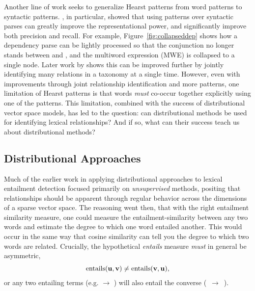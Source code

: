 Another line of work seeks to generalize Hearst patterns from word patterns
to syntactic patterns. , in particular, showed that
using patterns over syntactic parses can greatly improve the representational power,
and significantly improve both precision and recall. For example,
Figure~\ref{fig:collapseddep} shows how a dependency parse can be lightly
processed so that the conjunction  no longer stands between
 and , and the multiword expression (MWE) 
is collapsed to a single node. Later work by  shows
this can be improved further by jointly identifying many relations in a
taxonomy at a single time. However, even with improvements through joint
relationship identification and more patterns, one limitation of Hearst
patterns is that words {\em must} co-occur together explicitly using one of
the patterns. This limitation, combined with the success of distributional
vector space models, has led to the question: can distributional methods be
used for identifying lexical relationships? And if so, what can their
success teach us about distributional methods?

\subsection{Distributional Approaches}
\label{sec:dih}

Much of the earlier work in applying distributional approaches to lexical
entailment detection focused primarily on {\em unsupervised} methods, positing
that relationships should be apparent through regular behavior across the
dimensions of a sparse vector space. The reasoning went then, that with the
right entailment similarity measure, one could measure the
entailment-similarity between any two words and estimate the degree to which
one word entailed another. This would occur in the same way that cosine
similarity can tell you the degree to which two words are related. Crucially,
the hypothetical {\em entails} measure {\em must} in general be asymmetric,
\begin{equation*}
  \mbox{entails}({\mathbf{u}}, {\mathbf{v}}) \neq \mbox{entails}({\mathbf{v}}, {\mathbf{u}}),
\end{equation*}
or any two entailing terms (e.g.  $\rightarrow$ ) will
also entail the converse \mbox{( $\rightarrow$ )}.


